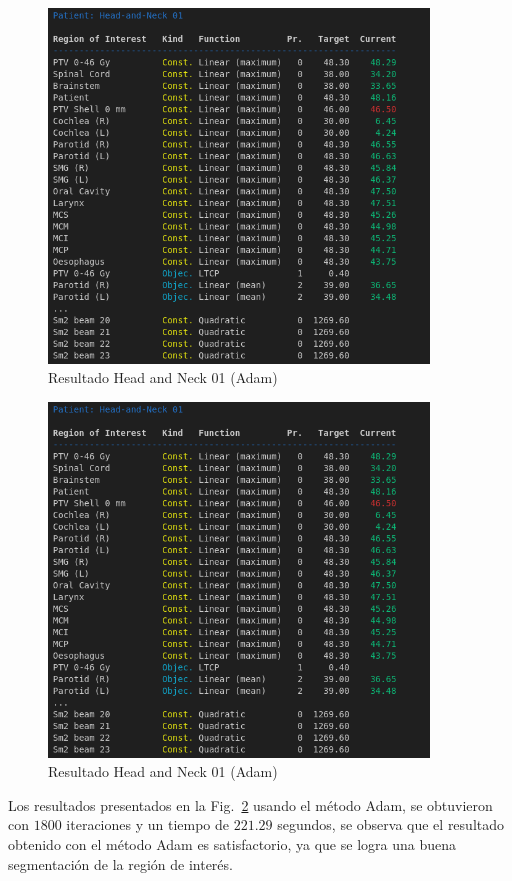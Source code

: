 \documentclass[a4paper,12pt]{article}
\begin{document}
\begin{figure}[!ht]
    \centering
    \includegraphics[width=0.9\textwidth]{result_adam01.png}
    \caption{Resultado Head and Neck 01 (Adam)}
    \label{fig:result_adam}
\end{figure}

\begin{figure}[!ht]
    \centering
    \includegraphics[width=0.9\textwidth]{result_adam02.png}
    \caption{Resultado Head and Neck 01 (Adam)}
    \label{fig:result_adam}
\end{figure}
Los resultados presentados en la Fig.~\ref{fig:result_adam} usando el método Adam, se obtuvieron con $1800$ iteraciones y un tiempo de $221.29$ segundos, se observa que el resultado obtenido con el método Adam es satisfactorio, ya que se logra una buena segmentación de la región de interés.
\end{document}
